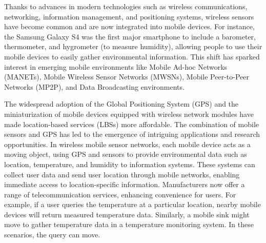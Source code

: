 Thanks to advances in modern technologies such as wireless communications, networking, information management, and positioning systems, wireless sensors have become common and are now integrated into mobile devices. For instance, the Samsung Galaxy S4 was the first major smartphone to include a barometer, thermometer, and hygrometer (to measure humidity), allowing people to use their mobile devices to easily gather environmental information. This shift has sparked interest in emerging mobile environments like Mobile Ad-hoc Networks (MANETs), Mobile Wireless Sensor Networks (MWSNs), Mobile Peer-to-Peer Networks (MP2P), and Data Broadcasting environments.

The widespread adoption of the Global Positioning System (GPS) and the miniaturization of mobile devices equipped with wireless network modules have made location-based services (LBSs) more affordable. The combination of mobile sensors and GPS has led to the emergence of intriguing applications and research opportunities. In wireless mobile sensor networks, each mobile device acts as a moving object, using GPS and sensors to provide environmental data such as location, temperature, and humidity to information systems. These systems can collect user data and send user location through mobile networks, enabling immediate access to location-specific information. Manufacturers now offer a range of telecommunication services, enhancing convenience for users. For example, if a user queries the temperature at a particular location, nearby mobile devices will return measured temperature data. Similarly, a mobile sink might move to gather temperature data in a temperature monitoring system. In these scenarios, the query can move.
